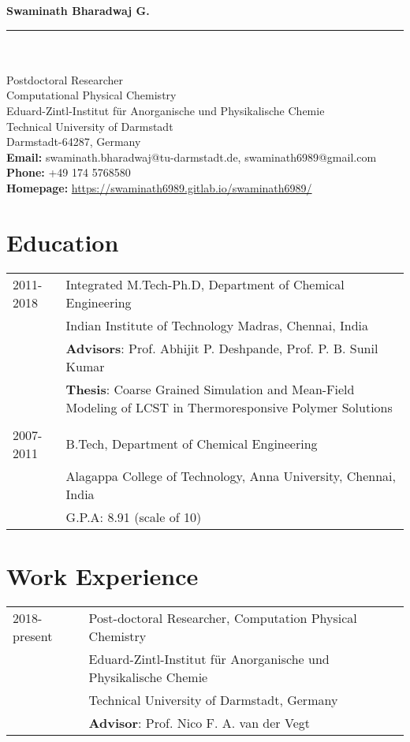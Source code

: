 \documentclass[a4paper,14pt]{article}
\begin{document}
\noindent\textbf{\Large Swaminath Bharadwaj G.}\\
\rule{\textwidth}{1pt}\\\ \\
{\normalsize
\noindent Postdoctoral Researcher\\
Computational Physical Chemistry\\
Eduard-Zintl-Institut f{\"u}r Anorganische und Physikalische Chemie\\
Technical University of Darmstadt \\
Darmstadt-64287, Germany\\
\textbf{Email:} swaminath.bharadwaj@tu-darmstadt.de, swaminath6989@gmail.com\\
\textbf{Phone:} +49 174 5768580\\
\textbf{Homepage:} \href{https://swaminath6989.gitlab.io/swaminath6989/}{https://swaminath6989.gitlab.io/swaminath6989/}\\
}
\section*{\large Education}
\begin{tabular}{l p{14cm}}
2011-2018&Integrated M.Tech-Ph.D, Department of Chemical Engineering\\
& Indian Institute of Technology Madras, Chennai, India\\
& \textbf{Advisors}: Prof. Abhijit P. Deshpande, Prof. P. B. Sunil Kumar\\
& \textbf{Thesis}: Coarse Grained Simulation and Mean-Field Modeling of LCST in Thermoresponsive Polymer Solutions\\
&\\
2007-2011&B.Tech, Department of Chemical Engineering\\
& Alagappa College of Technology, Anna University, Chennai, India\\
& G.P.A: 8.91 (scale of 10)
\end{tabular}
\section*{\large Work Experience}
\begin{tabular}{l p{14cm}}
2018-present& Post-doctoral Researcher, Computation Physical Chemistry\\
& Eduard-Zintl-Institut f{\"u}r Anorganische und Physikalische Chemie\\
& Technical University of Darmstadt, Germany\\
& \textbf{Advisor}: Prof. Nico F. A. van der Vegt\\
\end{tabular}
\end{document}
